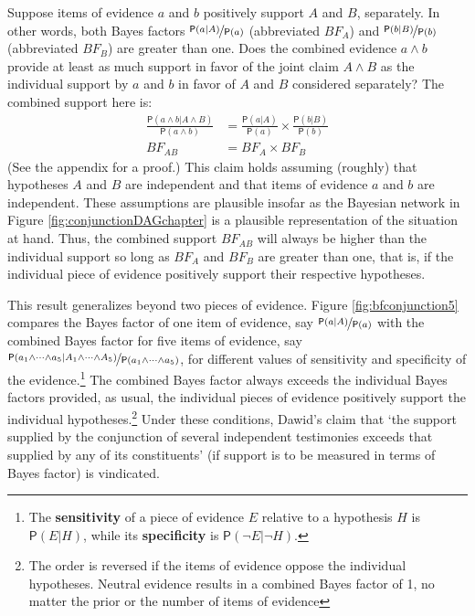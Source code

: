 \documentclass[
  10pt,
  dvipsnames,enabledeprecatedfontcommands]{scrartcl}
\newcommand{\pr}[1]{\ensuremath{\mathsf{P}(#1)}}
\begin{document}
Suppose items of evidence \(a\) and \(b\) positively support \(A\) and
\(B\), separately. In other words, both Bayes factors
\(\nicefrac{\pr{a \vert A}}{\pr{a}}\) (abbreviated \(BF_A\)) and
\(\nicefrac{\pr{b \vert B}}{\pr{b}}\) (abbreviated \(BF_B\)) are greater
than one. Does the combined evidence \(a \wedge b\) provide at least as
much support in favor of the joint claim \(A \wedge B\) as the
individual support by \(a\) and \(b\) in favor of \(A\) and \(B\)
considered separately? The combined support here is: \begin{align*}
\frac{\pr{a \wedge b \vert A \wedge B}}{\pr{a \wedge b}} &= \frac{\pr{a \vert A}}{\pr{a}} \times \frac{\pr{b \vert B}}{\pr{b}}\\
BF_{AB} &= BF_{A} \times BF_{B}
\end{align*} \noindent (See the appendix for a proof.) This claim holds
assuming (roughly) that hypotheses \(A\) and \(B\) are independent and
that items of evidence \(a\) and \(b\) are independent. These
assumptions are plausible insofar as the Bayesian network in Figure
\ref{fig:conjunctionDAGchapter} is a plausible representation of the
situation at hand. Thus, the combined support \(BF_{AB}\) will always be
higher than the individual support so long as \(BF_{A}\) and \(BF_{B}\)
are greater than one, that is, if the individual piece of evidence
positively support their respective hypotheses.

This result generalizes beyond two pieces of evidence. Figure
\ref{fig:bfconjunction5} compares the Bayes factor of one item of
evidence, say \(\nicefrac{\pr{a \vert A}}{\pr{a}}\) with the combined
Bayes factor for five items of evidence, say
\(\nicefrac{\pr{a_1 \wedge \dots \wedge a_5 \vert A_1 \wedge \dots \wedge A_5}}{\pr{a_1\wedge \dots \wedge a_5}}\),
for different values of sensitivity and specificity of the
evidence.\footnote{The \textbf{sensitivity} of a piece of evidence \(E\)
  relative to a hypothesis \(H\) is \(\pr{E \vert H}\), while its
  \textbf{specificity} is \(\pr{\neg E \vert \neg H}\).} The combined
Bayes factor always exceeds the individual Bayes factors provided, as
usual, the individual pieces of evidence positively support the
individual hypotheses.\footnote{The order is reversed if the items of
  evidence oppose the individual hypotheses. Neutral evidence results in
  a combined Bayes factor of 1, no matter the prior or the number of
  items of evidence} Under these conditions, Dawid's claim that `the
support supplied by the conjunction of several independent testimonies
exceeds that supplied by any of its constituents' (if support is to be
measured in terms of Bayes factor) is vindicated.
\end{document}

